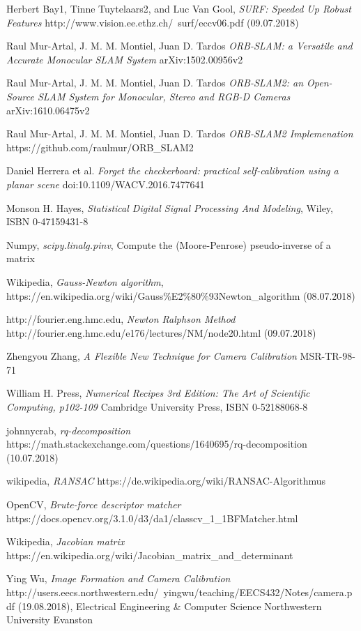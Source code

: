 \documentclass[11pt,a4paper,titlepage,oneside]{report}
\begin{document}
\begin{thebibliography}{1}

  Herbert Bay1, Tinne Tuytelaars2, and Luc Van Gool,
  \textit{SURF: Speeded Up Robust Features}
  http://www.vision.ee.ethz.ch/~surf/eccv06.pdf (09.07.2018)

  Raul Mur-Artal, J. M. M. Montiel, Juan D. Tardos
  \textit{ORB-SLAM: a Versatile and Accurate Monocular SLAM System}
  arXiv:1502.00956v2

  Raul Mur-Artal, J. M. M. Montiel, Juan D. Tardos
  \textit{ORB-SLAM2: an Open-Source SLAM System for Monocular, Stereo and RGB-D Cameras}
	arXiv:1610.06475v2 

  Raul Mur-Artal, J. M. M. Montiel, Juan D. Tardos
  \textit{ORB-SLAM2 Implemenation}
	https://github.com/raulmur/ORB\_SLAM2


  Daniel Herrera et al.
  \textit{Forget the checkerboard: practical self-calibration using a planar scene}
  doi:10.1109/WACV.2016.7477641

  Monson H. Hayes,
  \textit{Statistical Digital Signal Processing And Modeling},
  Wiley, ISBN 0-47159431-8

  Numpy,
  \textit{scipy.linalg.pinv},
  Compute the (Moore-Penrose) pseudo-inverse of a matrix

  Wikipedia,
  \textit{Gauss-Newton algorithm},
  https://en.wikipedia.org/wiki/Gauss\%E2\%80\%93Newton\_algorithm (08.07.2018)

  http://fourier.eng.hmc.edu,
  \textit{Newton Ralphson Method}
  http://fourier.eng.hmc.edu/e176/lectures/NM/node20.html (09.07.2018)

  Zhengyou Zhang,
  \textit{A Flexible New Technique for Camera Calibration}
  MSR-TR-98-71

	William H. Press,
	\textit{Numerical Recipes 3rd Edition: The Art of Scientific Computing, p102-109} 
	Cambridge University Press, ISBN 0-52188068-8

	johnnycrab,
	\textit{rq-decomposition} 
	https://math.stackexchange.com/questions/1640695/rq-decomposition (10.07.2018)

	wikipedia,
	\textit{RANSAC}
	https://de.wikipedia.org/wiki/RANSAC-Algorithmus

	OpenCV,
	\textit{Brute-force descriptor matcher}
	https://docs.opencv.org/3.1.0/d3/da1/classcv\_1\_1BFMatcher.html

	Wikipedia,
	\textit{Jacobian matrix}
	https://en.wikipedia.org/wiki/Jacobian\_matrix\_and\_determinant

	Ying Wu,
	\textit{Image Formation and Camera Calibration}
	http://users.eecs.northwestern.edu/~yingwu/teaching/EECS432/Notes/camera.pdf (19.08.2018), Electrical Engineering \& Computer Science Northwestern University Evanston

\end{thebibliography}
\end{document}
